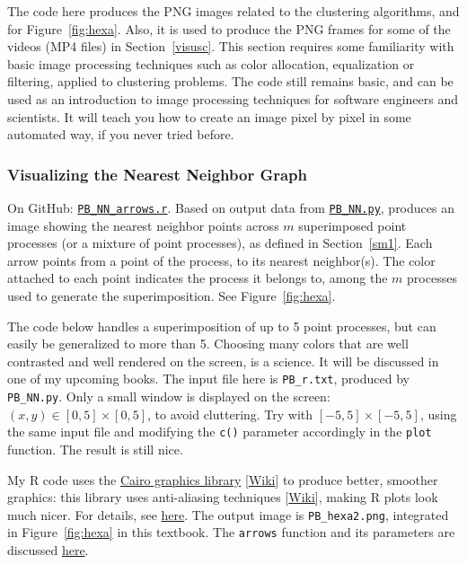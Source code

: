 \documentclass[10pt]{article}
\begin{document}
The code here produces the PNG images related to the clustering algorithms, and for Figure~\ref{fig:hexa}. Also, it is used to produce the PNG frames for some of the videos (MP4 files) in
Section~\ref{visusc}.  This section requires some familiarity with basic image processing techniques such as
color allocation, equalization or filtering, applied to clustering problems. The code still remains basic, and can be used as an introduction to image processing techniques for software engineers and scientists. It will teach you how to create an image pixel by pixel in some automated way, if you never tried before.  

\subsubsection{Visualizing the Nearest Neighbor Graph}\label{rrr4}

{On GitHub}: \href{https://github.com/VincentGranville/Point-Processes/blob/main/Source\%20Code/PP_NN_arrows.r}{\texttt{PB\_NN\_arrows.r}}. Based on output data from 
       \href{https://github.com/VincentGranville/Point-Processes/blob/main/Source\%20Code/PB_NN.py}{\texttt{PB\_NN.py}}, produces an image showing the nearest neighbor points
     across $m$ superimposed point processes (or a mixture of point processes), as defined in Section~\ref{sm1}. Each arrow points from a point of the process, to its nearest neighbor(s). 
    The color attached to each point indicates the process it belongs to, among the $m$ processes used to generate the superimposition. See
    Figure~\ref{fig:hexa}. 

The code below handles a superimposition of up to 5 point processes, but can easily be generalized to more than 5. Choosing many colors that are well contrasted
and well rendered on the screen, is a science. It will be discussed in one of my upcoming books. The input file here is \texttt{PB\_r.txt}, produced by \texttt{PB\_NN.py}. Only a small window is displayed on the screen: $(x, y)\in [0, 5] \times [0, 5]$,
to avoid cluttering. Try with $[-5, 5] \times [-5,5]$, using the same input file and modifying the \texttt{c()} parameter accordingly in the 
\texttt{plot} function. The result is still nice. 

My R code uses the \href{https://www.cairographics.org/}{Cairo graphics library} [\href{https://en.wikipedia.org/wiki/Cairo_(graphics)}{Wiki}] to 
produce better, smoother graphics: this library uses anti-aliasing techniques [\href{https://en.wikipedia.org/wiki/Spatial_anti-aliasing}{Wiki}], making R
plots look much nicer. For details, see \href{https://www.rdocumentation.org/packages/Cairo/versions/1.5-14/topics/Cairo}{here}. The output image is 
\texttt{PB\_hexa2.png}, integrated in Figure~\ref{fig:hexa} in this textbook.  The \texttt{arrows} function and its parameters are discussed
\href{https://stat.ethz.ch/R-manual/R-devel/library/graphics/html/arrows.html}{here}.
\end{document}
